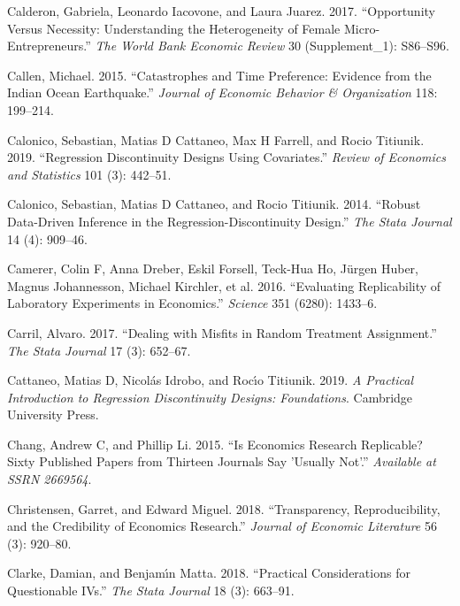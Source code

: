\documentclass[
]{book}
\begin{document}
\leavevmode\hypertarget{ref-calderon2017opportunity}{}%
Calderon, Gabriela, Leonardo Iacovone, and Laura Juarez. 2017. ``Opportunity Versus Necessity: Understanding the Heterogeneity of Female Micro-Entrepreneurs.'' \emph{The World Bank Economic Review} 30 (Supplement\_1): S86--S96.

\leavevmode\hypertarget{ref-callen2015catastrophes}{}%
Callen, Michael. 2015. ``Catastrophes and Time Preference: Evidence from the Indian Ocean Earthquake.'' \emph{Journal of Economic Behavior \& Organization} 118: 199--214.

\leavevmode\hypertarget{ref-calonico2019regression}{}%
Calonico, Sebastian, Matias D Cattaneo, Max H Farrell, and Rocio Titiunik. 2019. ``Regression Discontinuity Designs Using Covariates.'' \emph{Review of Economics and Statistics} 101 (3): 442--51.

\leavevmode\hypertarget{ref-calonico2014robust}{}%
Calonico, Sebastian, Matias D Cattaneo, and Rocio Titiunik. 2014. ``Robust Data-Driven Inference in the Regression-Discontinuity Design.'' \emph{The Stata Journal} 14 (4): 909--46.

\leavevmode\hypertarget{ref-camerer2016evaluating}{}%
Camerer, Colin F, Anna Dreber, Eskil Forsell, Teck-Hua Ho, Jürgen Huber, Magnus Johannesson, Michael Kirchler, et al. 2016. ``Evaluating Replicability of Laboratory Experiments in Economics.'' \emph{Science} 351 (6280): 1433--6.

\leavevmode\hypertarget{ref-carril2017dealing}{}%
Carril, Alvaro. 2017. ``Dealing with Misfits in Random Treatment Assignment.'' \emph{The Stata Journal} 17 (3): 652--67.

\leavevmode\hypertarget{ref-cattaneo2019}{}%
Cattaneo, Matias D, Nicolás Idrobo, and Rocı́o Titiunik. 2019. \emph{A Practical Introduction to Regression Discontinuity Designs: Foundations}. Cambridge University Press.

\leavevmode\hypertarget{ref-chang2015economics}{}%
Chang, Andrew C, and Phillip Li. 2015. ``Is Economics Research Replicable? Sixty Published Papers from Thirteen Journals Say 'Usually Not'.'' \emph{Available at SSRN 2669564}.

\leavevmode\hypertarget{ref-christensen2018transparency}{}%
Christensen, Garret, and Edward Miguel. 2018. ``Transparency, Reproducibility, and the Credibility of Economics Research.'' \emph{Journal of Economic Literature} 56 (3): 920--80.

\leavevmode\hypertarget{ref-clarke2018}{}%
Clarke, Damian, and Benjamı́n Matta. 2018. ``Practical Considerations for Questionable IVs.'' \emph{The Stata Journal} 18 (3): 663--91.
\end{document}

